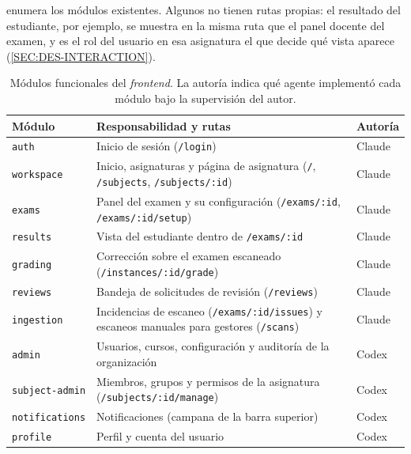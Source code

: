  enumera los módulos existentes. Algunos no tienen rutas propias:
el resultado del estudiante, por ejemplo, se muestra en la misma ruta que el panel docente
del examen, y es el rol del usuario en esa asignatura el que decide qué vista aparece
(\cref{SEC:DES-INTERACTION}).

\begin{table}[ht]
  \centering
  \small
  \begin{tabular}{|l|p{6.2cm}|l|}
    \hline
    \textbf{Módulo} & \textbf{Responsabilidad y rutas} & \textbf{Autoría} \\
    \hline
    \texttt{auth} & Inicio de sesión (\texttt{/login}) & Claude \\
    \texttt{workspace} & Inicio, asignaturas y página de asignatura
                         (\texttt{/}, \texttt{/subjects}, \texttt{/subjects/:id}) & Claude \\
    \texttt{exams} & Panel del examen y su configuración
                     (\texttt{/exams/:id}, \texttt{/exams/:id/setup}) & Claude \\
    \texttt{results} & Vista del estudiante dentro de \texttt{/exams/:id} & Claude \\
    \texttt{grading} & Corrección sobre el examen escaneado
                       (\texttt{/instances/:id/grade}) & Claude \\
    \texttt{reviews} & Bandeja de solicitudes de revisión (\texttt{/reviews}) & Claude \\
    \texttt{ingestion} & Incidencias de escaneo (\texttt{/exams/:id/issues}) y
                         escaneos manuales para gestores (\texttt{/scans}) & Claude \\
    \texttt{admin} & Usuarios, cursos, configuración y auditoría de la organización & Codex \\
    \texttt{subject-admin} & Miembros, grupos y permisos de la asignatura
                             (\texttt{/subjects/:id/manage}) & Codex \\
    \texttt{notifications} & Notificaciones (campana de la barra superior) & Codex \\
    \texttt{profile} & Perfil y cuenta del usuario & Codex \\
    \hline
  \end{tabular}
  \caption{Módulos funcionales del \textit{frontend}. La autoría indica qué agente
           implementó cada módulo bajo la supervisión del autor.}
  \label{TAB:DES-FEATURES}
\end{table}

